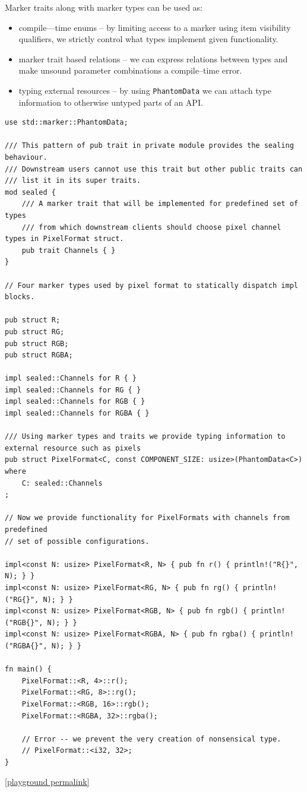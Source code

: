 Marker traits along with marker types can be used as:
\begin{itemize}
    \item compile---time enums -- by limiting access to a marker using item visibility qualifiers, we strictly control what types implement given functionality.
    \item marker trait based relations -- we can express relations between types and make unsound parameter combinations a compile--time error.
    \item typing external resources -- by using \texttt{PhantomData} we can attach type information to otherwise untyped parts of an API.
\end{itemize}

\begin{lstlisting}
use std::marker::PhantomData;

/// This pattern of pub trait in private module provides the sealing behaviour.
/// Downstream users cannot use this trait but other public traits can
/// list it in its super traits.
mod sealed {
    /// A marker trait that will be implemented for predefined set of types
    /// from which downstream clients should choose pixel channel types in PixelFormat struct.
    pub trait Channels { }
}

// Four marker types used by pixel format to statically dispatch impl blocks.

pub struct R;
pub struct RG;
pub struct RGB;
pub struct RGBA;

impl sealed::Channels for R { }
impl sealed::Channels for RG { }
impl sealed::Channels for RGB { }
impl sealed::Channels for RGBA { }

/// Using marker types and traits we provide typing information to external resource such as pixels
pub struct PixelFormat<C, const COMPONENT_SIZE: usize>(PhantomData<C>)
where 
    C: sealed::Channels
;

// Now we provide functionality for PixelFormats with channels from predefined
// set of possible configurations.

impl<const N: usize> PixelFormat<R, N> { pub fn r() { println!("R{}", N); } }
impl<const N: usize> PixelFormat<RG, N> { pub fn rg() { println!("RG{}", N); } }
impl<const N: usize> PixelFormat<RGB, N> { pub fn rgb() { println!("RGB{}", N); } }
impl<const N: usize> PixelFormat<RGBA, N> { pub fn rgba() { println!("RGBA{}", N); } }

fn main() {
    PixelFormat::<R, 4>::r();
    PixelFormat::<RG, 8>::rg();
    PixelFormat::<RGB, 16>::rgb();
    PixelFormat::<RGBA, 32>::rgba();
    
    // Error -- we prevent the very creation of nonsensical type.
    // PixelFormat::<i32, 32>;
}
\end{lstlisting}
\noindent \href{https://play.rust-lang.org/?version=stable&mode=debug&edition=2021&gist=7d092a3be5593833894fa27b5fa56757}{[playground permalink]}

